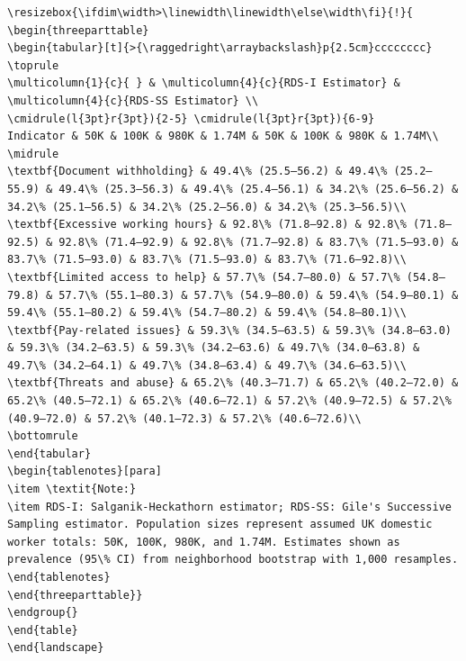 \documentclass[
  12pt,
  letterpaper,
  DIV=11,
  numbers=noendperiod]{scrartcl}
\theoremstyle{plain}
\theoremstyle{definition}
\begin{document}
\begin{table}
{\begin{verbatim}
\resizebox{\ifdim\width>\linewidth\linewidth\else\width\fi}{!}{
\begin{threeparttable}
\begin{tabular}[t]{>{\raggedright\arraybackslash}p{2.5cm}cccccccc}
\toprule
\multicolumn{1}{c}{ } & \multicolumn{4}{c}{RDS-I Estimator} & \multicolumn{4}{c}{RDS-SS Estimator} \\
\cmidrule(l{3pt}r{3pt}){2-5} \cmidrule(l{3pt}r{3pt}){6-9}
Indicator & 50K & 100K & 980K & 1.74M & 50K & 100K & 980K & 1.74M\\
\midrule
\textbf{Document withholding} & 49.4\% (25.5–56.2) & 49.4\% (25.2–55.9) & 49.4\% (25.3–56.3) & 49.4\% (25.4–56.1) & 34.2\% (25.6–56.2) & 34.2\% (25.1–56.5) & 34.2\% (25.2–56.0) & 34.2\% (25.3–56.5)\\
\textbf{Excessive working hours} & 92.8\% (71.8–92.8) & 92.8\% (71.8–92.5) & 92.8\% (71.4–92.9) & 92.8\% (71.7–92.8) & 83.7\% (71.5–93.0) & 83.7\% (71.5–93.0) & 83.7\% (71.5–93.0) & 83.7\% (71.6–92.8)\\
\textbf{Limited access to help} & 57.7\% (54.7–80.0) & 57.7\% (54.8–79.8) & 57.7\% (55.1–80.3) & 57.7\% (54.9–80.0) & 59.4\% (54.9–80.1) & 59.4\% (55.1–80.2) & 59.4\% (54.7–80.2) & 59.4\% (54.8–80.1)\\
\textbf{Pay-related issues} & 59.3\% (34.5–63.5) & 59.3\% (34.8–63.0) & 59.3\% (34.2–63.5) & 59.3\% (34.2–63.6) & 49.7\% (34.0–63.8) & 49.7\% (34.2–64.1) & 49.7\% (34.8–63.4) & 49.7\% (34.6–63.5)\\
\textbf{Threats and abuse} & 65.2\% (40.3–71.7) & 65.2\% (40.2–72.0) & 65.2\% (40.5–72.1) & 65.2\% (40.6–72.1) & 57.2\% (40.9–72.5) & 57.2\% (40.9–72.0) & 57.2\% (40.1–72.3) & 57.2\% (40.6–72.6)\\
\bottomrule
\end{tabular}
\begin{tablenotes}[para]
\item \textit{Note:} 
\item RDS-I: Salganik-Heckathorn estimator; RDS-SS: Gile's Successive Sampling estimator. Population sizes represent assumed UK domestic worker totals: 50K, 100K, 980K, and 1.74M. Estimates shown as prevalence (95\% CI) from neighborhood bootstrap with 1,000 resamples.
\end{tablenotes}
\end{threeparttable}}
\endgroup{}
\end{table}
\end{landscape}
\end{verbatim}

}

\end{table}%
\end{document}
